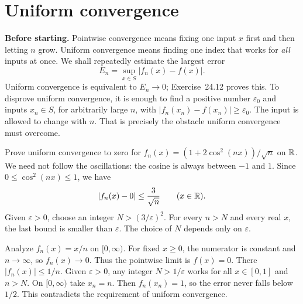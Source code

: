 \section{Uniform convergence}
\label{sec:uniform-convergence-new}
\textbf{Before starting.} Pointwise convergence means fixing one input $x$
first and then letting $n$ grow. Uniform convergence means finding one index
that works for \emph{all} inputs at once. We shall repeatedly estimate the
largest error
\[
 E_n=\sup_{x\in S}|f_n(x)-f(x)|.
\]
Uniform convergence is equivalent to $E_n\to0$; Exercise~24.12 proves this.
To disprove uniform convergence, it is enough to find a positive number
$\varepsilon_0$ and inputs $x_n\in S$, for arbitrarily large $n$, with
$|f_n(x_n)-f(x_n)|\ge\varepsilon_0$. The input is allowed to change with $n$.
That is precisely the obstacle uniform convergence must overcome.

\goal Prove uniform convergence to zero for
$f_n(x)=(1+2\cos^2(nx))/\sqrt n$ on $\mathbb{R}$.
\idea We need not follow the oscillations: the cosine is always between $-1$ and $1$.
Since $0\le\cos^2(nx)\le1$, we have
\[
 |f_n(x)-0|\le\frac3{\sqrt n}\qquad(x\in\mathbb{R}).
\]
Given $\varepsilon>0$, choose an integer $N>(3/\varepsilon)^2$.
For every $n>N$ and every real $x$, the last bound is smaller than
$\varepsilon$. The choice of $N$ depends only on $\varepsilon$.

\goal Analyze $f_n(x)=x/n$ on $[0,\infty)$.
For fixed $x\ge0$, the numerator is constant and $n\to\infty$, so
$f_n(x)\to0$. Thus the pointwise limit is $f(x)=0$.
There $|f_n(x)|\le1/n$. Given $\varepsilon>0$, any integer
$N>1/\varepsilon$ works for all $x\in[0,1]$ and $n>N$.
On $[0,\infty)$ take $x_n=n$. Then $f_n(x_n)=1$, so the error never
falls below $1/2$. This contradicts the requirement of uniform convergence.
\answer{The limit is zero everywhere; convergence is uniform on $[0,1]$
but not on $[0,\infty)$.}

